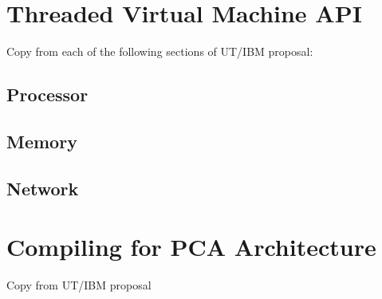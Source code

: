 \documentclass[10pt]{article}
\begin{document}
%  

  \section{Threaded Virtual Machine API}
  Copy from each of the following sections of UT/IBM proposal:
  \subsection{Processor}
  \subsection{Memory}
  \subsection{Network}

  \clearpage
  

  \section{Compiling for PCA Architecture}
  Copy from UT/IBM proposal


% 
% 
  
\end{document}
